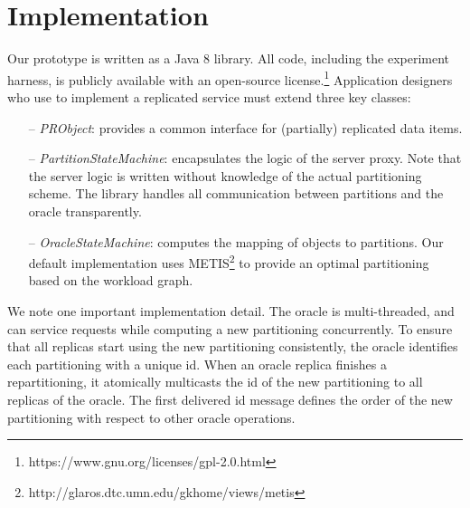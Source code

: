 \section{Implementation}
\label{sec:implementation}


Our  \dynastar prototype is written as a
Java 8 library.
All code, including the experiment harness,
is publicly available with an open-source
license.\footnote{https://www.gnu.org/licenses/gpl-2.0.html}
Application designers who use \dynastar
 to implement a replicated service must extend three key classes:
 \begin{itemize}
 \item[--] \emph{PRObject}: provides a common interface for (partially) replicated data items.
 \item[--] \emph{PartitionStateMachine}: encapsulates the logic of the server
   proxy. Note that the server logic is written without knowledge of the actual partitioning scheme. The \dynastar library
   handles all communication between partitions and the oracle transparently.
 \item[--] \emph{OracleStateMachine}: computes the mapping of objects to partitions.
Our default implementation uses METIS\footnote{http://glaros.dtc.umn.edu/gkhome/views/metis} to provide an optimal partitioning based on the workload graph.
 \end{itemize}

 We note one important implementation detail.  The oracle is
 multi-threaded, and can service requests while computing a new
 partitioning concurrently. To ensure that all replicas start using
 the new partitioning consistently, the oracle identifies each
 partitioning with a unique id.  When an oracle replica finishes a
 repartitioning, it atomically multicasts the id of the new
 partitioning to all replicas of the oracle.  The first delivered id
 message defines the order of the new partitioning with respect to
 other oracle operations.




